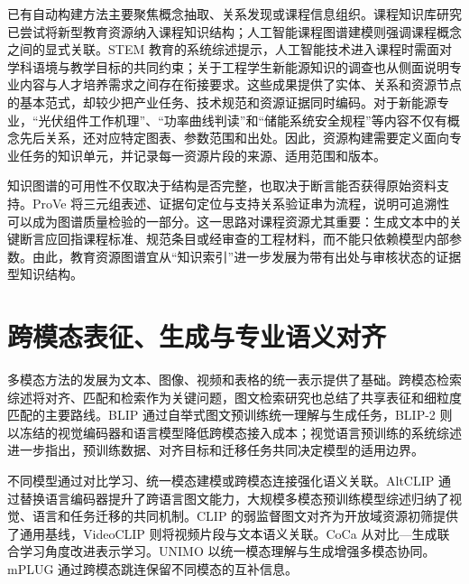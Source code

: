 \documentclass[UTF8,11pt]{ctexart}
\begin{document}
已有自动构建方法主要聚焦概念抽取、关系发现或课程信息组织\cite{automaticconstructionof2023,coursekganeducational2024,asurveyof2024}。课程知识库研究已尝试将新型教育资源纳入课程知识结构\cite{constructionandimplementation2023}；人工智能课程图谱建模则强调课程概念之间的显式关联\cite{openingknowledgegraph2022}。STEM 教育的系统综述提示，人工智能技术进入课程时需面对学科语境与教学目标的共同约束\cite{theapplicationof2022}；关于工程学生新能源知识的调查也从侧面说明专业内容与人才培养需求之间存在衔接要求\cite{knowledgeperceptionand2022}。这些成果提供了实体、关系和资源节点的基本范式，却较少把产业任务、技术规范和资源证据同时编码。对于新能源专业，``光伏组件工作机理''、``功率曲线判读''和``储能系统安全规程''等内容不仅有概念先后关系，还对应特定图表、参数范围和出处。因此，资源构建需要定义面向专业任务的知识单元，并记录每一资源片段的来源、适用范围和版本。

知识图谱的可用性不仅取决于结构是否完整，也取决于断言能否获得原始资料支持。ProVe 将三元组表述、证据句定位与支持关系验证串为流程，说明可追溯性可以成为图谱质量检验的一部分\cite{proveapipeline2023}。这一思路对课程资源尤其重要：生成文本中的关键断言应回指课程标准、规范条目或经审查的工程材料，而不能只依赖模型内部参数。由此，教育资源图谱宜从``知识索引''进一步发展为带有出处与审核状态的证据型知识结构。

\section{跨模态表征、生成与专业语义对齐}
多模态方法的发展为文本、图像、视频和表格的统一表示提供了基础。跨模态检索综述将对齐、匹配和检索作为关键问题\cite{crossmodalretrieval2024}，图文检索研究也总结了共享表征和细粒度匹配的主要路线\cite{imagetextretrieval2022}。BLIP 通过自举式图文预训练统一理解与生成任务\cite{blipbootstrappinglanguage2022}，BLIP-2 则以冻结的视觉编码器和语言模型降低跨模态接入成本\cite{blip2bootstrapping2023}；视觉语言预训练的系统综述进一步指出，预训练数据、对齐目标和迁移任务共同决定模型的适用边界\cite{vlpasurvey2023}。

不同模型通过对比学习、统一模态建模或跨模态连接强化语义关联。AltCLIP 通过替换语言编码器提升了跨语言图文能力\cite{altclipalteringthe2023}，大规模多模态预训练模型综述归纳了视觉、语言和任务迁移的共同机制\cite{largescalemulti2023}。CLIP 的弱监督图文对齐为开放域资源初筛提供了通用基线\cite{scalingupvisual2021}，VideoCLIP 则将视频片段与文本语义关联\cite{videoclipcontrastivepre2021}。CoCa 从对比—生成联合学习角度改进表示学习\cite{cocacontrastivecaptioners2022}。UNIMO 以统一模态理解与生成增强多模态协同\cite{unimotowardsunified2021}。mPLUG 通过跨模态跳连保留不同模态的互补信息\cite{mplugeffectiveand2022}。
\end{document}
